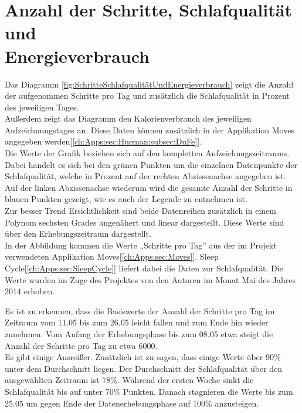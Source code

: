 \section{Anzahl der Schritte, Schlafqualität und\\ Energieverbrauch}
\label{ch:AnalyseUndEvaluierung:sec:SchritteSchlafqualitätUndEnergieverbrauch}


Das Diagramm \ref{fig:SchritteSchlafqualitätUndEnergieverbrauch} zeigt die Anzahl der aufgenommen Schritte pro Tag und zusätzlich die Schlafqualität in Prozent des jeweiligen Tages. \\
Außerdem zeigt das Diagramm den Kalorienverbrauch des jeweiligen Aufzeichnungstages an.
Diese Daten können zusätzlich in der Applikation Moves angegeben werden[\ref{ch:Apps:sec:Hueman:subsec:DuFe}]. \\ 
Die Werte der Grafik beziehen sich auf den kompletten Aufzeichnugszeitraums. 
Dabei handelt es sich bei den grünen Punkten um die einzelnen Datenpunkte der Schlafqualität, welche in Prozent auf der rechten Abzissenachse angegeben ist.
Auf der linken Abzissenachse wiederum wird die gesamte Anzahl der Schritte in blauen Punkten gezeigt, wie es auch der Legende zu entnehmen ist. \\
Zur besser Trend Ersichtlichkeit sind beide Datenreihen zusätzlich in einem Polynom sechsten Grades angenähert und linear dargestellt.
Diese Werte sind über den Erhebungszeitraum dargestellt. \\
In der Abbildung kommen die Werte „Schritte pro Tag” aus der im Projekt verwendeten Applikation Moves[\ref{ch:Apps:sec:Moves}]. 
Sleep Cycle[\ref{ch:Apps:sec:SleepCycle}] liefert dabei die Daten zur Schlafqualität.
Die Werte wurden im Zuge des Projektes von den Autoren im Monat Mai des Jahres 2014 erhoben.

Es ist zu erkennen, dass die Basiswerte der Anzahl der Schritte pro Tag im Zeitraum vom 11.05 bis zum 26.05 leicht fallen und zum Ende hin wieder zunehmen. 
Vom Anfang der Erhebungsphase bis zum 08.05 etwa steigt die Anzahl der Schritte pro Tag zu etwa 6000. \\
Es gibt einige Ausreißer.
Zusätzlich ist zu sagen, dass einige Werte über 90\% unter dem Durchschnitt liegen.
Der Durchschnitt der Schlafqualität über den ausgewählten Zeitraum ist 78\%.
Während der ersten Woche sinkt die Schlafqualität bis auf unter 70\% Punkten.
Danach stagnieren die Werte bis zum 25.05 um gegen Ende der Datenerhebungsphase auf 100\% anzusteigen.


